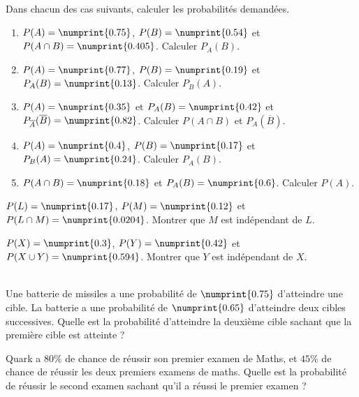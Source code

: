 \documentclass[main.tex]{subfiles}
\begin{document}
\begin{exercise}\label{chapter02:exercise:B02} 
	Dans chacun des cas suivants, calculer les probabilités demandées.
	\begin{enumerate}[label=\arabic*),leftmargin=*]
		\item 	$P(A)=\numprint{0.75}$, $P(B)=\numprint{0.54}$ et $P(A\cap B)=\numprint{0.405}$. Calculer $P_A(B)$.
		\item $P(A)=\numprint{0.77}$, $P(B)=\numprint{0.19}$ et $P_A(B)=\numprint{0.13}$. Calculer $P_B(A)$. %
		\item $P(A)=\numprint{0.35}$ et $P_A(B)=\numprint{0.42}$ et $P_{\overline{A}}(\overline{B})=\numprint{0.82}$. Calculer $P(A\cap B)$  et $P_A(\overline{B})$. 
		\item $P(A)=\numprint{0.4}$, $P(B)=\numprint{0.17}$ et $P_B(A)=\numprint{0.24}$. Calculer $P_A(B)$. %
		\item $P(A\cap B)=\numprint{0.18}$ et $P_A(B)=\numprint{0.6}$. Calculer $P(A)$.
	\end{enumerate}
\end{exercise}
\begin{exercise}\label{chapter02:exercise:B03}  $P(L)=\numprint{0.17}$, $P(M)=\numprint{0.12}$ et $P(L\cap M)=\numprint{0.0204}$. Montrer que $M$ est indépendant de $L$. 
\end{exercise}
\begin{exercise}\label{chapter02:exercise:B04}  $P(X)=\numprint{0.3}$, $P(Y)=\numprint{0.42}$ et $P(X\cup Y)=\numprint{0.594}$. Montrer que $Y$ est indépendant de $X$. 
\end{exercise} 
\begin{exercise}\label{chapter02:exercise:B05}  \hfill \\ Une batterie de missiles a une probabilité de $\numprint{0.75}$ d'atteindre une cible. La batterie a une probabilité de $\numprint{0.65}$ d'atteindre deux cibles successives. Quelle est la probabilité d'atteindre la deuxième cible sachant que la première cible est atteinte ?
\end{exercise}
\begin{exercise}\label{chapter02:exercise:B06}  Quark a $80\%$ de chance de réussir son premier examen de Maths, et $45\%$ de chance de réussir les deux premiers examens de maths. Quelle est la probabilité de réussir le second examen sachant qu'il a réussi le premier examen ? 
\end{exercise}

\end{document}
